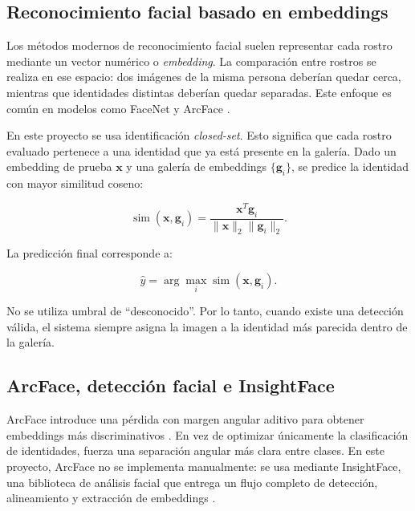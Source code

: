\documentclass[11pt]{article}
\begin{document}
\subsection{Reconocimiento facial basado en embeddings}

Los métodos modernos de reconocimiento facial suelen representar cada rostro mediante un vector numérico o \textit{embedding}. La comparación entre rostros se realiza en ese espacio: dos imágenes de la misma persona deberían quedar cerca, mientras que identidades distintas deberían quedar separadas. Este enfoque es común en modelos como FaceNet \cite{schroff2015facenet} y ArcFace \cite{deng2019arcface}.

En este proyecto se usa identificación \textit{closed-set}. Esto significa que cada rostro evaluado pertenece a una identidad que ya está presente en la galería. Dado un embedding de prueba $\mathbf{x}$ y una galería de embeddings $\{\mathbf{g}_i\}$, se predice la identidad con mayor similitud coseno:

\begin{equation}
    \operatorname{sim}(\mathbf{x}, \mathbf{g}_i)
    =
    \frac{\mathbf{x}^{T}\mathbf{g}_i}{\|\mathbf{x}\|_2\|\mathbf{g}_i\|_2}.
\end{equation}

La predicción final corresponde a:

\begin{equation}
    \hat{y} = \arg\max_i \operatorname{sim}(\mathbf{x}, \mathbf{g}_i).
\end{equation}

No se utiliza umbral de ``desconocido''. Por lo tanto, cuando existe una detección válida, el sistema siempre asigna la imagen a la identidad más parecida dentro de la galería.

\subsection{ArcFace, detección facial e InsightFace}

ArcFace introduce una pérdida con margen angular aditivo para obtener embeddings más discriminativos \cite{deng2019arcface}. En vez de optimizar únicamente la clasificación de identidades, fuerza una separación angular más clara entre clases. En este proyecto, ArcFace no se implementa manualmente: se usa mediante InsightFace, una biblioteca de análisis facial que entrega un flujo completo de detección, alineamiento y extracción de embeddings \cite{insightface2026}.
\end{document}
